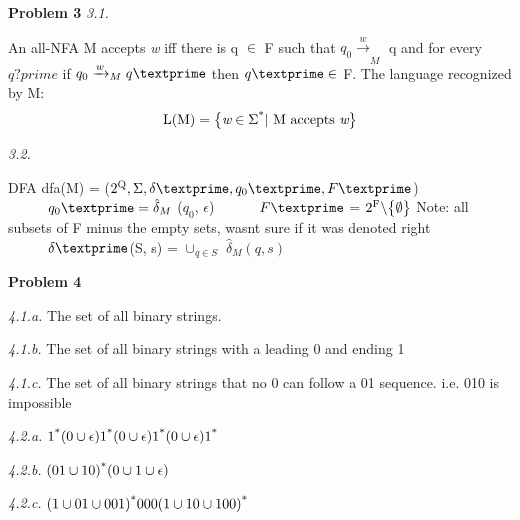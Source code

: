 \documentclass[12pt]{report}
\begin{document}
\textbf{Problem 3}\newline
\textit{3.1.}
\begin{flushleft}
	An all-NFA M accepts \textit w iff there is q $\in$ F such that $q_0 \xrightarrow[]{w}_M$ q and for every $q\text{?}prime$ if $q_0 \xrightarrow[]{w}_Mq\textprime$ then $q\textprime \in$ F. \newline\newline
	The language recognized by M:\newline
	\begin{equation*}
		\text{L(M)} = \big\{ \textit w \in \Sigma\textsuperscript{*} \vert \text{ M accepts } \textit w \big\}
	\end{equation*}
\end{flushleft}

\textit{3.2.}
\begin{flushleft}
	DFA dfa(M) = ($2\textsuperscript{Q}, \Sigma, \delta\textprime, q_0\textprime, F\textprime$)\newline
	$\tab q_0\textprime = \hat{\delta}_M$ ($q_0$, $\epsilon$)\newline
	$\tab F\textprime$ = $2\textsuperscript{F} \backslash \big\{\emptyset\big\}$ {\scriptsize Note: all subsets of F minus the empty sets, wasnt sure if it was denoted right}\newline
	$\tab \delta\textprime$(S, s) = $\cup_{q \in S}$ $\hat{\delta}_M(q, s)$
\end{flushleft}

\pagebreak
\textbf{Problem 4}\newline

\textit{4.1.a.}\newline
The set of all binary strings.\newline

\textit{4.1.b.}\newline
The set of all binary strings with a leading 0 and ending 1\newline

\textit{4.1.c.}\newline
The set of all binary strings that no 0 can follow a 01 sequence. i.e. 010 is impossible\newline

\textit{4.2.a.}\newline
$1\textsuperscript{*} (0 \cup \epsilon) 1\textsuperscript{*} (0 \cup \epsilon) 1\textsuperscript{*} (0 \cup \epsilon) 1\textsuperscript{*}$\newline

\textit{4.2.b.}\newline
$(01 \cup 10)\textsuperscript{*}(0 \cup 1 \cup \epsilon)$\newline

\textit{4.2.c.}\newline
$(1 \cup 01 \cup 001)\textsuperscript{*}000(1 \cup 10 \cup 100)\textsuperscript{*}$
\end{document}
